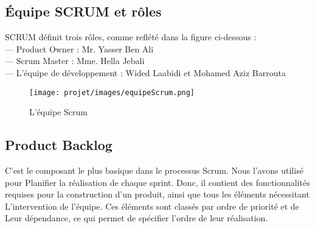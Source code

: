 \subsection{Équipe SCRUM et rôles}
SCRUM définit trois rôles, comme reflété dans la figure ci-dessous :\\
— Product Owner : Mr. Yasser Ben Ali\\
— Scrum Master : Mme. Hella Jebali\\
— L’équipe de développement : Wided Laabidi et Mohamed Aziz Barrouta

\begin{figure}[H]
    \centering
    \texttt{[image: projet/images/equipeScrum.png]}
    \caption{L'équipe Scrum}
    \label{fig:equipe_scrum}
\end{figure}

\subsection{Product Backlog}
C'est le composant le plus basique dans le processus Scrum. Nous l’avons utilisé pour
Planifier la réalisation de chaque sprint. Donc, il contient des fonctionnalités
requises pour la construction d’un produit, ainsi que tous les éléments nécessitant
L’intervention de l’équipe. Ces éléments sont classés par ordre de priorité et de
Leur dépendance, ce qui permet de spécifier l’ordre de leur réalisation.\\

